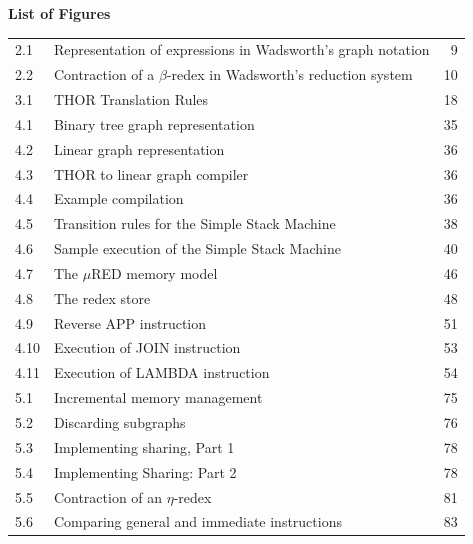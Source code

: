 \clearpage
\thispagestyle{plain}
\begin{center}
\textbf{List of Figures}
\end{center}

\vspace{0.3in}

\begin{tabular}{@{}p{0.55in}p{4.55in}r@{}}
2.1 & Representation of expressions in Wadsworth's graph notation & 9\\
2.2 & Contraction of a \(\beta\)-redex in Wadsworth's reduction system & 10\\
3.1 & THOR Translation Rules & 18\\
4.1 & Binary tree graph representation & 35\\
4.2 & Linear graph representation & 36\\
4.3 & THOR to linear graph compiler & 36\\
4.4 & Example compilation & 36\\
4.5 & Transition rules for the Simple Stack Machine & 38\\
4.6 & Sample execution of the Simple Stack Machine & 40\\
4.7 & The \(\mu\)RED memory model & 46\\
4.8 & The redex store & 48\\
4.9 & Reverse APP instruction & 51\\
4.10 & Execution of JOIN instruction & 53\\
4.11 & Execution of LAMBDA instruction & 54\\
5.1 & Incremental memory management & 75\\
5.2 & Discarding subgraphs & 76\\
5.3 & Implementing sharing, Part 1 & 78\\
5.4 & Implementing Sharing: Part 2 & 78\\
5.5 & Contraction of an \(\eta\)-redex & 81\\
5.6 & Comparing general and immediate instructions & 83\\
\end{tabular}
